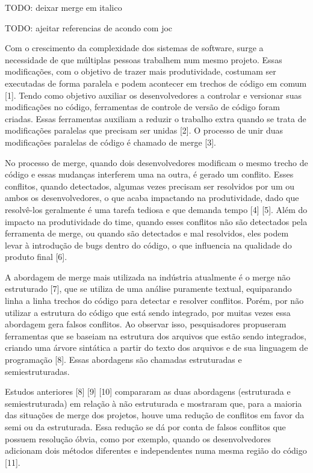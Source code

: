 
TODO: deixar merge em italico

TODO: ajeitar referencias de acondo com joc

Com o crescimento da complexidade dos sistemas de software, surge a necessidade
de que múltiplas pessoas trabalhem num mesmo projeto. Essas modificações, com o
objetivo de trazer mais produtividade, costumam ser executadas de forma paralela e podem acontecer em
trechos de código em comum [1]. Tendo como objetivo auxiliar os desenvolvedores a
controlar e versionar suas modificações no código, ferramentas de controle de versão de
código foram criadas. Essas ferramentas auxiliam a reduzir o trabalho extra quando se trata de
modificações paralelas que precisam ser unidas [2]. O processo de unir duas modificações
paralelas de código é chamado de merge [3].

No processo de merge, quando dois desenvolvedores modificam o mesmo trecho de
código e essas mudanças interferem uma na outra, é gerado um conflito. Esses conflitos,
quando detectados, algumas vezes precisam ser resolvidos por um ou ambos os desenvolvedores, o
que acaba impactando na produtividade, dado que resolvê-los geralmente é uma tarefa tediosa
e que demanda tempo [4] [5]. Além do impacto na produtividade do time, quando esses conflitos
não são detectados pela ferramenta de merge, ou quando são detectados e mal resolvidos, eles
podem levar à introdução de bugs dentro do código, o que influencia na qualidade do produto final [6].

A abordagem de merge mais utilizada na indústria atualmente é o merge não estruturado [7],
que se utiliza de uma análise puramente textual, equiparando linha a linha trechos do código
para detectar e resolver conflitos. Porém, por não utilizar a estrutura do código que está sendo
integrado, por muitas vezes essa abordagem gera falsos conflitos. Ao observar isso, pesquisadores
propuseram ferramentas que se baseiam na estrutura dos arquivos que estão sendo integrados, criando
uma árvore sintática a partir do texto dos arquivos e de sua linguagem de programação [8].
Essas abordagens são chamadas estruturadas e semiestruturadas.

Estudos anteriores [8] [9] [10] compararam as duas abordagens (estruturada e semiestruturada)
em relação à não estruturada e mostraram que, para a maioria das situações de merge dos projetos,
houve uma redução de conflitos em favor da semi ou da estruturada. Essa redução se dá por conta
de falsos conflitos que possuem resolução óbvia, como por exemplo, quando os desenvolvedores adicionam
dois métodos diferentes e independentes numa mesma região do código [11].

